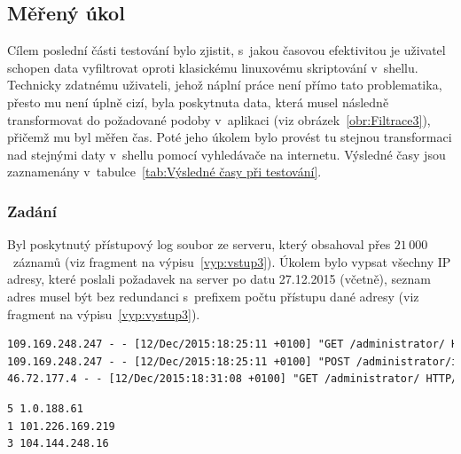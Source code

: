 \subsection*{Měřený úkol}
Cílem poslední části testování bylo zjistit, s~jakou časovou efektivitou je uživatel schopen data vyfiltrovat oproti klasickému linuxovému skriptování v~shellu. Technicky zdatnému uživateli, jehož náplní práce není přímo tato problematika, přesto mu není úplně cizí, byla poskytnuta data, která musel následně transformovat do požadované podoby v~aplikaci (viz obrázek~\ref{obr:Filtrace3}), přičemž mu byl měřen čas. Poté jeho úkolem bylo provést tu stejnou transformaci nad stejnými daty v~shellu pomocí vyhledávače na internetu. Výsledné časy jsou zaznamenány v~tabulce~\ref{tab:Výsledné časy při testování}.

\subsubsection{Zadání}
Byl poskytnutý přístupový log soubor ze serveru, který obsahoval přes $21\,000$~záznamů (viz fragment na výpisu~\ref{vyp:vstup3}). Úkolem bylo vypsat všechny IP adresy, které poslali požadavek na server po datu 27.12.2015 (včetně), seznam adres musel být bez redundanci s~prefixem počtu přístupu dané adresy (viz fragment na výpisu~\ref{vyp:vystup3}).

\begin{lstlisting}[language=TeX, caption={Fragment výstupních dat.}, label={vyp:vstup3}]
109.169.248.247 - - [12/Dec/2015:18:25:11 +0100] "GET /administrator/ HTTP/1.1" 200 4263 "-" "Mozilla/5.0 (Windows NT 6.0; rv:34.0) Gecko/20100101 Firefox/34.0" "-"
109.169.248.247 - - [12/Dec/2015:18:25:11 +0100] "POST /administrator/index.php HTTP/1.1" 200 4494 "http://almhuette-raith.at/administrator/" "Mozilla/5.0 (Windows NT 6.0; rv:34.0) Gecko/20100101 Firefox/34.0" "-"
46.72.177.4 - - [12/Dec/2015:18:31:08 +0100] "GET /administrator/ HTTP/1.1" 200 4263 "-" "Mozilla/5.0 (Windows NT 6.0; rv:34.0) Gecko/20100101 Firefox/34.0" "-"
\end{lstlisting}

\begin{lstlisting}[language=TeX, caption={Fragment výstupních dat.}, label={vyp:vystup3}]
5 1.0.188.61
1 101.226.169.219
3 104.144.248.16
\end{lstlisting}

